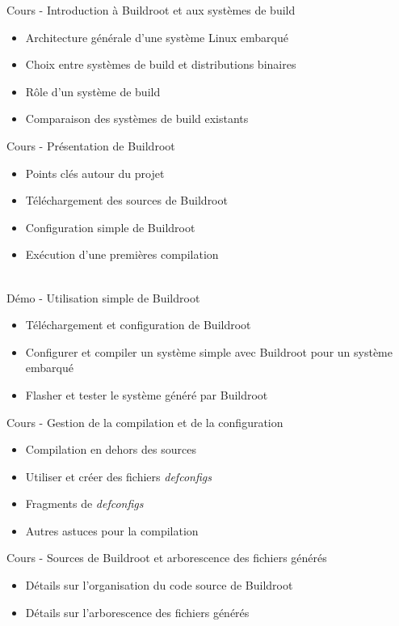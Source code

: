 \documentclass[a4paper,12pt,obeyspaces,spaces,hyphens]{article}
\begin{document}
\feagendatwocolumn
{Cours - Introduction à Buildroot et aux systèmes de build}
{
  \begin{itemize}
  \item Architecture générale d'une système Linux embarqué
  \item Choix entre systèmes de build et distributions binaires
  \item Rôle d'un système de build
  \item Comparaison des systèmes de build existants
  \end{itemize}
}
{Cours - Présentation de Buildroot}
{
  \begin{itemize}
  \item Points clés autour du projet
  \item Téléchargement des sources de Buildroot
  \item Configuration simple de Buildroot
  \item Exécution d'une premières compilation
  \end{itemize}
}
\\
\feagendatwocolumn
{Démo - Utilisation simple de Buildroot}
{
  \begin{itemize}
  \item Téléchargement et configuration de Buildroot
  \item Configurer et compiler un système simple avec Buildroot pour
    un système embarqué
  \item Flasher et tester le système généré par Buildroot
  \end{itemize}
}
{Cours - Gestion de la compilation et de la configuration}
{
  \begin{itemize}
  \item Compilation en dehors des sources
  \item Utiliser et créer des fichiers {\em defconfigs}
  \item Fragments de {\em defconfigs}
  \item Autres astuces pour la compilation
  \end{itemize}
}

\feagendaonecolumn
{Cours - Sources de Buildroot et arborescence des fichiers générés}
{
  \begin{itemize}
  \item Détails sur l'organisation du code source de Buildroot
  \item Détails sur l'arborescence des fichiers générés
  \end{itemize}
}
\end{document}
